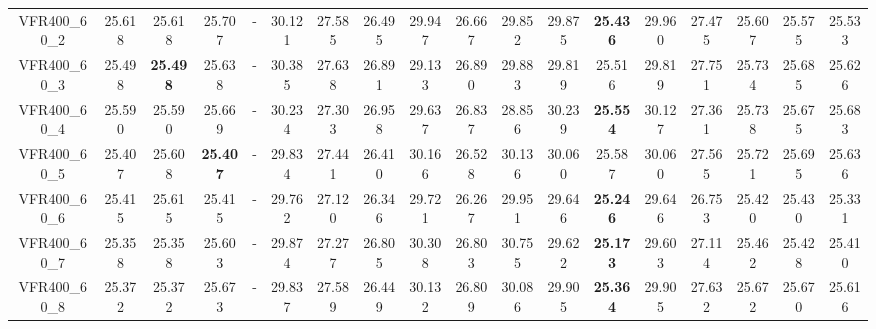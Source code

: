 \begin{tabular}{cc|ccc|ccccccccccccc}
VFR400\_60\_2      & 25.618           & 25.618           & 25.707           & -                & 30.121           & 27.585           & 26.495           & 29.947           & 26.667           & 29.852           & 29.875           & {\bf 25.436}     & 29.960           & 27.475           & 25.607           & 25.575           & 25.533          \\ 
VFR400\_60\_3      & 25.498           & {\bf 25.498}     & 25.638           & -                & 30.385           & 27.638           & 26.891           & 29.133           & 26.890           & 29.883           & 29.819           & 25.516           & 29.819           & 27.751           & 25.734           & 25.685           & 25.626          \\ 
VFR400\_60\_4      & 25.590           & 25.590           & 25.669           & -                & 30.234           & 27.303           & 26.958           & 29.637           & 26.837           & 28.856           & 30.239           & {\bf 25.554}     & 30.127           & 27.361           & 25.738           & 25.675           & 25.683          \\ 
VFR400\_60\_5      & 25.407           & 25.608           & {\bf 25.407}     & -                & 29.834           & 27.441           & 26.410           & 30.166           & 26.528           & 30.136           & 30.060           & 25.587           & 30.060           & 27.565           & 25.721           & 25.695           & 25.636          \\ 
VFR400\_60\_6      & 25.415           & 25.615           & 25.415           & -                & 29.762           & 27.120           & 26.346           & 29.721           & 26.267           & 29.951           & 29.646           & {\bf 25.246}     & 29.646           & 26.753           & 25.420           & 25.430           & 25.331          \\ 
VFR400\_60\_7      & 25.358           & 25.358           & 25.603           & -                & 29.874           & 27.277           & 26.805           & 30.308           & 26.803           & 30.755           & 29.622           & {\bf 25.173}     & 29.603           & 27.114           & 25.462           & 25.428           & 25.410          \\ 
VFR400\_60\_8      & 25.372           & 25.372           & 25.673           & -                & 29.837           & 27.589           & 26.449           & 30.132           & 26.809           & 30.086           & 29.905           & {\bf 25.364}     & 29.905           & 27.632           & 25.672           & 25.670           & 25.616          \\ 

\end{tabular}
